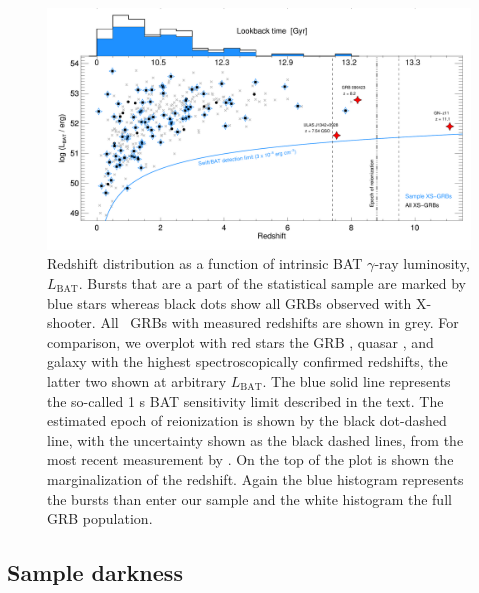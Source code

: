 \documentclass{aa}    %
\begin{document}
\begin{figure}
	\centering \includegraphics[width=16cm]{figures/XSGRB_redshift_swiftdots.pdf}
\caption{Redshift distribution as a function of intrinsic BAT $\gamma$-ray
	luminosity, $L_{\mathrm{BAT}}$. Bursts that are a part of the statistical
	sample are marked by blue stars whereas black dots show all GRBs observed with
	X-shooter. All \swift~GRBs with measured redshifts are shown in grey. For
	comparison, we overplot with red stars the GRB \citep{Tanvir2009b,
		Salvaterra2009a}, quasar \citep{Banados2017}, and galaxy \citep{Oesch2016} with
	the highest spectroscopically confirmed redshifts, the latter two shown at
	arbitrary $L_{\mathrm{BAT}}$. The blue solid line represents the so-called 1 s
	BAT sensitivity limit described in the text. The estimated epoch of
	reionization is shown by the black dot-dashed line, with the uncertainty shown
	as the black dashed lines, from the most recent measurement by
	\citet{Planck2015}. On the top of the plot is shown the marginalization of the
	redshift. Again the blue histogram represents the bursts than enter our sample
	and the white histogram the full GRB population. } \label{fig:z}
\end{figure}



\subsection{Sample darkness} \label{darkness}
\end{document}

